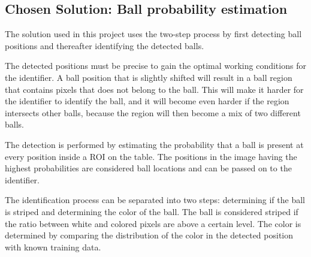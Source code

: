 \subsection{Chosen Solution: Ball probability estimation}
The solution used in this project uses the two-step process by first detecting ball positions and thereafter identifying the detected balls.

The detected positions must be precise to gain the optimal working conditions for the identifier. A ball position that is slightly shifted will result in a ball region that contains pixels that does not belong to the ball. This will make it harder for the identifier to identify the ball, and it will become even harder if the region intersects other balls, because the region will then become a mix of two different balls. 

The detection is performed by estimating the probability that a ball is present at every position inside a ROI on the table. The positions in the image having the highest probabilities are considered ball locations and can be passed on to the identifier.

The identification process can be separated into two steps: determining if the ball is striped and determining the color of the ball. The ball is considered striped if the ratio between white and colored pixels are above a certain level. The color is determined by comparing the distribution of the color in the detected position with known training data.